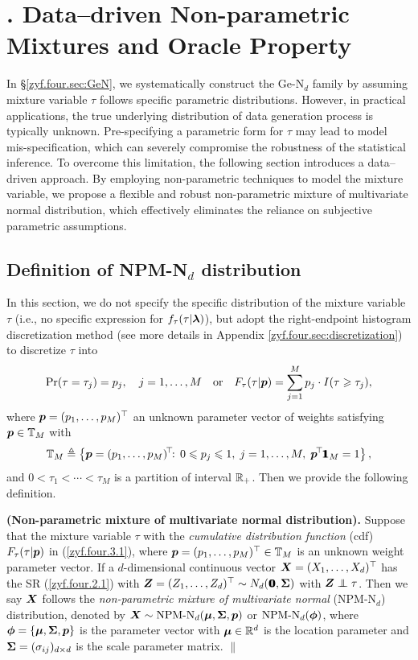\section{$\!\!\!\!\!\!\!$. Data--driven Non-parametric Mixtures and Oracle Property}       %

In \S\ref{zyf.four.sec:GeN}, we systematically construct the Ge-N$_d$ family by assuming mixture variable $\tau$ follows specific parametric distributions. However, in practical applications, the true underlying distribution of data generation process is typically unknown.  Pre-specifying a parametric form for $\tau$ may lead to model mis-specification, which can severely compromise the robustness of the statistical inference. To overcome this limitation, the following section introduces a data--driven approach. By employing non-parametric techniques to model the mixture variable, we propose a flexible and robust non-parametric mixture of multivariate normal distribution, which effectively eliminates the reliance on subjective parametric assumptions.

\subsection{Definition of NPM-N$_d$ distribution}\label{zyf.four.sec:NPMN.definition}       %

In this section, we do not specify the specific distribution of the mixture variable $\tau$ (i.e., no specific expression for $f_\tau(\tau|{\boldsymbol{\lambda}})$), but adopt the right-endpoint histogram discretization method (see more details in Appendix \ref{zyf.four.sec:discretization}) to discretize \trv $\tau$ into
\begin{eqnarray}    \label{zyf.four.3.1}
    \Pr(\tau = \tau_j) = p_j, \quad j = 1, \dots, M \quad \mbox{or} \quad F_\tau(\tau|{\boldsymbol{p}}) = \sum_{j=1}^M p_j \cdot I(\tau \geqslant \tau_j),
\end{eqnarray}
where ${\boldsymbol{p}} = (p_1, \dots, p_M)^\top$ an unknown parameter vector of weights satisfying ${\boldsymbol{p}} \in {\mathbb{T}}_M$ with
$$
   {\mathbb{T}}_M \triangleq \left\{{\boldsymbol{p}} = (p_1, \dots, p_M)^{\!\top\!} \mbox{: } 0 \leqslant p_j \leqslant 1, \; j = 1, \dots, M, \; {\boldsymbol{p}}^{\!\top\!}{\bf 1}\!\!\!{\bf 1}_M = 1 \right\},
$$
and $0 < \tau_1 < \cdots < \tau_M$ is a partition of interval ${\mathbb{R}}_+$. Then we provide the following definition.
\begin{definition}{\rm \textbf{(Non-parametric mixture of multivariate normal distribution).} Suppose that the mixture variable $\tau$ with the \textit{cumulative distribution function} (cdf) $F_\tau(\tau | {\boldsymbol{p}})$ in (\ref{zyf.four.3.1}), where ${\boldsymbol{p}} = (p_1, \dots, p_M)^\top \in {\mathbb{T}}_M$ is an unknown weight parameter vector. If a $d$-dimensional continuous vector ${\boldsymbol{X}} = (X_1, \dots, X_d)^\top$ has the SR (\ref{zyf.four.2.1}) with ${\boldsymbol{Z}} = (Z_1, \dots, Z_d)^\top \sim N_d({\bf 0}\!\!\!{\bf 0}, {\mbox{\boldmath$\Sigma$}})$ with $\ibZ \inde \tau$. Then we say ${\boldsymbol{X}}$ follows the \textit{non-parametric mixture of multivariate normal} (NPM-N$_d$) distribution, denoted by ${\boldsymbol{X}} \sim \mbox{NPM-N}_d({\boldsymbol{\mu}}, {\mbox{\boldmath$\Sigma$}}, {\boldsymbol{p}})$ or $\mbox{NPM-N}_d({\boldsymbol{\phi}})$, where ${\boldsymbol{\phi}} = \{{\boldsymbol{\mu}}, {\mbox{\boldmath$\Sigma$}}, {\boldsymbol{p}}\}$ is the parameter vector with ${\boldsymbol{\mu}} \in {\mathbb{R}}^d$ is the location parameter and ${\mbox{\boldmath$\Sigma$}} = (\sigma_{ij})_{d \times d}$ is the scale parameter matrix. \hfill $\|$
}\end{definition}

